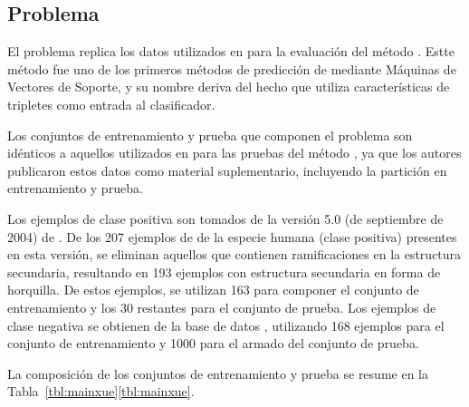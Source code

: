 %
%
\subsection{Problema \tripletsvm}
%
El problema \prob{\tripletsvm} replica los datos utilizados
en \cite{xue} para la evaluación del método \work{\tripletsvm}.
Estte método fue uno de los primeros métodos de predicción de
 mediante Máquinas de Vectores de Soporte, y su nombre
deriva del hecho que utiliza características de tripletes como entrada
al clasificador.

Los conjuntos de entrenamiento y prueba que componen el problema
\prob{\tripletsvm} son idénticos a aquellos utilizados en \cite{xue}
para las pruebas del método \work{\tripletsvm}, ya que los autores
publicaron estos datos como material suplementario, incluyendo la
partición en entrenamiento y prueba.

Los ejemplos de clase positiva son tomados de la versión 5.0 (de
septiembre de 2004) de \work\mirbase.
De los 207 ejemplos de  de la especie humana (clase
positiva) presentes en esta versión, se eliminan aquellos que
contienen ramificaciones en la estructura secundaria, resultando en
193 ejemplos con estructura secundaria en forma de horquilla.
De estos ejemplos, se utilizan 163 para componer el conjunto de
entrenamiento y los 30 restantes para el conjunto de prueba.
Los ejemplos de clase negativa se obtienen de la base de datos
, utilizando 168 ejemplos para el conjunto de
entrenamiento y 1000 para el armado del conjunto de prueba.

La composición de los conjuntos de entrenamiento y prueba se resume en
la \iflatexml{}Tabla~\ref{tbl:mainxue}\else\autoref{tbl:mainxue}\fi.
